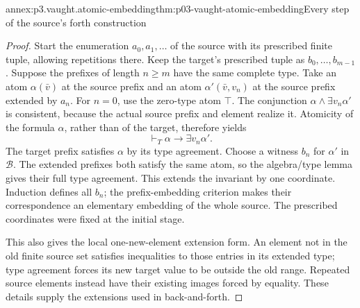 \begin{annexitem}{annex:p3.vaught.atomic-embedding}{thm:p03-vaught-atomic-embedding}{Every step of the source's forth construction}
\begin{proof}
Start the enumeration \(a_0,a_1,\ldots\) of the source with its
prescribed finite tuple, allowing repetitions there.
Keep the target's prescribed tuple as \(b_0,\ldots,b_{m-1}\).
Suppose the prefixes of length \(n\geq m\) have the same complete
type. Take an atom \(\alpha(\bar v)\) at the source prefix and an
atom \(\alpha'(\bar v,v_n)\) at the source prefix extended by \(a_n\).
For \(n=0\), use the zero-type atom \(\top\).
The conjunction \(\alpha\land\exists v_n\alpha'\) is consistent,
because the actual source prefix and element realize it.
Atomicity of the formula \(\alpha\), rather than of the target,
therefore yields
\[
                  \vdash_T\alpha\to\exists v_n\alpha'.
\]
The target prefix satisfies \(\alpha\) by its type agreement.
Choose a witness \(b_n\) for \(\alpha'\) in \(\mathcal B\).
The extended prefixes both satisfy the same atom, so the
algebra/type lemma gives their full type agreement.
This extends the invariant by one coordinate.
Induction defines all \(b_n\); the prefix-embedding criterion makes
their correspondence an elementary embedding of the whole source.
The prescribed coordinates were fixed at the initial stage.

This also gives the local one-new-element extension form.
An element not in the old finite source set satisfies inequalities
to those entries in its extended type; type agreement forces its
new target value to be outside the old range. Repeated source
elements instead have their existing images forced by equality.
These details supply the extensions used in back-and-forth.
\end{proof}
\end{annexitem}

